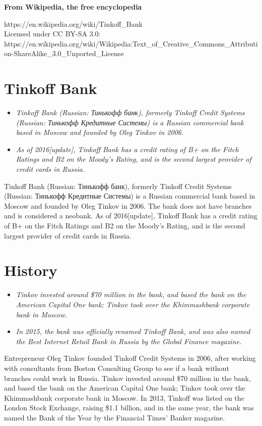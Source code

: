 \textbf{From Wikipedia, the free encyclopedia}

https://en.wikipedia.org/wiki/Tinkoff\_Bank\\
Licensed under CC BY-SA 3.0:\\
https://en.wikipedia.org/wiki/Wikipedia:Text\_of\_Creative\_Commons\_Attribution-ShareAlike\_3.0\_Unported\_License

\section{Tinkoff Bank}\label{tinkoff-bank}

\begin{itemize}
\item
  \emph{Tinkoff Bank (Russian: Тинькофф банк), formerly Tinkoff Credit
  Systems (Russian: Тинькофф Кредитные Системы) is a Russian commercial
  bank based in Moscow and founded by Oleg Tinkov in 2006.}
\item
  \emph{As of 2016{[}update{]}, Tinkoff Bank has a credit rating of B+
  on the Fitch Ratings and B2 on the Moody's Rating, and is the second
  largest provider of credit cards in Russia.}
\end{itemize}

Tinkoff Bank (Russian: Тинькофф банк), formerly Tinkoff Credit Systems
(Russian: Тинькофф Кредитные Системы) is a Russian commercial bank based
in Moscow and founded by Oleg Tinkov in 2006. The bank does not have
branches and is considered a neobank. As of 2016{[}update{]}, Tinkoff
Bank has a credit rating of B+ on the Fitch Ratings and B2 on the
Moody's Rating, and is the second largest provider of credit cards in
Russia.

\section{History}\label{history}

\begin{itemize}
\item
  \emph{Tinkov invested around \$70 million in the bank, and based the
  bank on the American Capital One bank; Tinkov took over the
  Khimmashbank corporate bank in Moscow.}
\item
  \emph{In 2015, the bank was officially renamed Tinkoff Bank, and was
  also named the Best Internet Retail Bank in Russia by the Global
  Finance magazine.}
\end{itemize}

Entrepreneur Oleg Tinkov founded Tinkoff Credit Systems in 2006, after
working with consultants from Boston Consulting Group to see if a bank
without branches could work in Russia. Tinkov invested around \$70
million in the bank, and based the bank on the American Capital One
bank; Tinkov took over the Khimmashbank corporate bank in Moscow. In
2013, Tinkoff was listed on the London Stock Exchange, raising \$1.1
billion, and in the same year, the bank was named the Bank of the Year
by the Financial Times' Banker magazine.

